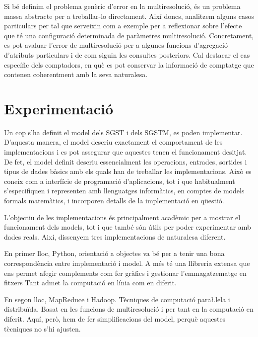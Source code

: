 Si bé definim el problema genèric d'error en la multiresolució, és un
problema massa abstracte per a treballar-lo directament. Així doncs,
analitzem alguns casos particulars per tal que serveixin com a exemple
per a reflexionar sobre l'efecte que té una configuració determinada
de paràmetres multiresolució. Concretament, es pot avaluar l'error de
multiresolució per a algunes funcions d'agregació d'atributs
particulars i de com siguin les consultes posteriors. Cal destacar el
cas específic dels comptadors, en què es pot conservar la informació
de comptatge que contenen coherentment amb la seva naturalesa.



\section{Experimentació}


Un cop s'ha definit el model dels \gls{SGST} i dels \gls{SGSTM}, es
poden implementar. D'aquesta manera, el model descriu exactament el
comportament de les implementacions i es pot assegurar que aquestes
tenen el funcionament desitjat.  De fet, el model definit descriu
essencialment les operacions, entrades, sortides i tipus de dades
bàsics amb els quals han de treballar les implementacions. Això es
coneix com a interfície de programació d'aplicacions, tot i que
habitualment s'especifiquen i representen amb llenguatges informàtics,
en comptes de models formals matemàtics, i incorporen detalls de la
implementació en qüestió.


L'objectiu de les implementacions és principalment acadèmic per a
mostrar el funcionament dels models, tot i que també són útils per
poder experimentar amb dades reals. Així, dissenyem tres
implementacions de naturalesa diferent. 





En primer lloc, 
Python, orientació a objectes va bé per a tenir una bona correspondència entre implementació i model. A més té una llibreria extensa que ens permet afegir complements com fer gràfics i gestionar l'emmagatzematge en fitxers
Tant admet la computació en línia com en diferit.


En segon lloc, MapReduce i Hadoop. Tècniques de computació para\l.lela i distribuïda. Basat en les funcions de multiresolució i per tant en la computació en diferit. Aquí, però, hem de fer simplificacions del model, perquè aquestes tècniques no s'hi ajusten. 


